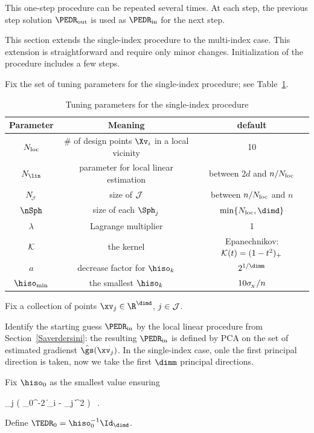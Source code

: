 This one-step procedure can be repeated several times.
At each step, the previous step solution \( \PEDR_{\outp} \) is used as \( \PEDR_{\init} \)
for the next step. 

This section extends the single-index procedure to the multi-index case. 
This extension is straightforward and require only minor changes.
Initialization of the procedure includes a few steps.

\begin{mylist}
\item
Fix the set of tuning parameters for the single-index procedure; see Table~\ref{TdefMImi}.
\begin{table}[b]
\begin{tabular}{c|c|c}
        \hline
        Parameter & Meaning & default \\
        \hline
        \( N_{\operatorname{loc}} \) & \( \# \) of design points \( \Xv_{i} \) in a local vicinity & 10 \\
        \( \numb_{\lin} \) & parameter for local linear estimation & 
        between \( 2d \) and \( n/N_{\operatorname{loc}} \) \\
        \( N_{\!_{\mathcal{J}}} \) & size of \( \mathcal{J} \) 				& between \( n/N_{\operatorname{loc}} \) and \( n \) \\
		\( \nSph \) & size of each \( \Sph_{j} \)		& \( \min\{ \nmin, \dimd \} \) \\
		\( \lambda \) & Lagrange multiplier 		& 1 \\
		\( \mathcal{K} \) & the kernel & Epanechnikov: \( \mathcal{K}(t) = (1-t^{2})_{+} \) \\
		\( a \)	& decrease factor for \( \hiso_{k} \) & \( 2^{1/\dimm} \) \\
		\( \hiso_{\min} \) & the smallest \( \hiso_{k} \) & \( 10 \sigma_{\!_{X}}/n \) \\
		\hline
    \end{tabular}
\caption{Tuning parameters for the single-index procedure}    
\label{TdefMImi}
\end{table}


\item
Fix a collection of points \( \xv_{j} \in \R^{\dimd} \), \( j \in \mathcal{J} \).

\item
Identify the starting guess \( \PEDR_{\init} \) by
the local linear procedure from Section~\ref{Saverdersini}:
the resulting \( \PEDR_{\init} \) is defined by PCA on the set of estimated gradienst \( \hat{\gs}(\xv_{j}) \).
In the single-index case, onle the first principal direction is taken, now we
take the first \( \dimm \) principal directions.

\item
Fix \( \hiso_{0} \) as the smallest value ensuring
\begin{EQA}[c]
	 \sum_{j \in \JJJ} 
	\sumi \Kern\bigl( \hiso_{0}^{-2} \| \Xv_{i} - \xv_{j} \|^{2} \bigr)
	\geq 
	\nmin
	\, .
\end{EQA}

\item
Define \( \TEDR_{0} = \hiso_{0}^{-1} \Id_{\dimd} \).
\end{mylist}


